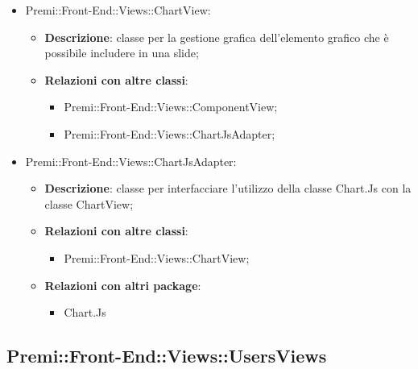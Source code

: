 \begin{itemize}
		\item Premi::Front-End::Views::ChartView:
		\begin{itemize}
			\item \textbf{Descrizione}: classe per la gestione grafica dell'elemento grafico che è possibile includere in una slide;
			\item \textbf{Relazioni con altre classi}:
			\begin{itemize}
				\item Premi::Front-End::Views::ComponentView;
				\item Premi::Front-End::Views::ChartJsAdapter;
			\end{itemize}
		\end{itemize}
		
		\item Premi::Front-End::Views::ChartJsAdapter:
		\begin{itemize}
			\item \textbf{Descrizione}: classe per interfacciare l'utilizzo della classe Chart.Js con la classe ChartView;
			\item \textbf{Relazioni con altre classi}:
			\begin{itemize}
				\item Premi::Front-End::Views::ChartView;
			\end{itemize}
			\item \textbf{Relazioni con altri package}:
			\begin{itemize}
				\item Chart.Js
			\end{itemize}
		\end{itemize}
	\end{itemize}
	
	
\subsection{Premi::Front-End::Views::UsersViews}
